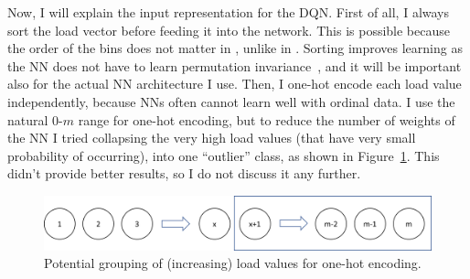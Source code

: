 Now, I will explain the input representation for the DQN. First of all, I always sort the load vector before feeding it into the network. This is possible because the order of the bins does not matter in \TwoThinning, unlike in \GraphicalTwoChoice. Sorting improves learning as the NN does not have to learn permutation invariance~\cite{zaheer2017permutationinvariance}, and it will be important also for the actual NN architecture I use. Then, I one-hot encode each load value independently, because NNs often cannot learn well with ordinal data. I use the natural $0$-$m$ range for one-hot encoding, but to reduce the number of weights of the NN I tried collapsing the very high load values (that have very small probability of occurring), into one ``outlier'' class, as shown in Figure~\ref{NN-maxload}. This didn't provide better results, so I do not discuss it any further.


\begin{figure}[h]
    \centering
    \includegraphics[scale=0.5]{Chapter2/Figs/NN_maxload.png}
    \caption{Potential grouping of (increasing) load values for one-hot encoding.}
    \label{NN-maxload}
\end{figure}

